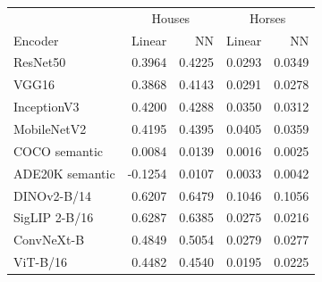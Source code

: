 \begin{tabular}{lrrrr}
\toprule
& \multicolumn{2}{c}{Houses} & \multicolumn{2}{c}{Horses}\\
Encoder & Linear & NN & Linear & NN\\
\midrule
ResNet50 & 0.3964 & 0.4225 & 0.0293 & 0.0349\\
VGG16 & 0.3868 & 0.4143 & 0.0291 & 0.0278\\
InceptionV3 & 0.4200 & 0.4288 & 0.0350 & 0.0312\\
MobileNetV2 & 0.4195 & 0.4395 & 0.0405 & 0.0359\\
COCO semantic & 0.0084 & 0.0139 & 0.0016 & 0.0025\\
ADE20K semantic & -0.1254 & 0.0107 & 0.0033 & 0.0042\\
DINOv2-B/14 & 0.6207 & 0.6479 & 0.1046 & 0.1056\\
SigLIP 2-B/16 & 0.6287 & 0.6385 & 0.0275 & 0.0216\\
ConvNeXt-B & 0.4849 & 0.5054 & 0.0279 & 0.0277\\
ViT-B/16 & 0.4482 & 0.4540 & 0.0195 & 0.0225\\
\bottomrule
\end{tabular}
